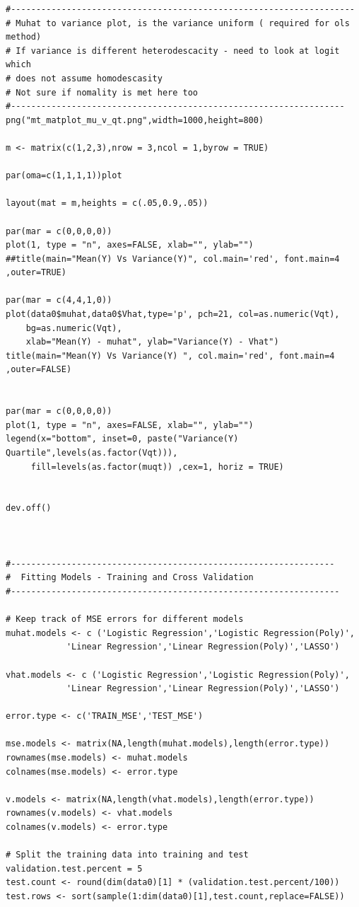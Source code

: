 \documentclass[twoside,12pt]{article}
\begin{document}
\begin{verbatim}
#--------------------------------------------------------------------
# Muhat to variance plot, is the variance uniform ( required for ols method)
# If variance is different heterodescacity - need to look at logit which
# does not assume homodescasity
# Not sure if nomality is met here too
#------------------------------------------------------------------
png("mt_matplot_mu_v_qt.png",width=1000,height=800)

m <- matrix(c(1,2,3),nrow = 3,ncol = 1,byrow = TRUE)

par(oma=c(1,1,1,1))plot

layout(mat = m,heights = c(.05,0.9,.05))

par(mar = c(0,0,0,0))
plot(1, type = "n", axes=FALSE, xlab="", ylab="")
##title(main="Mean(Y) Vs Variance(Y)", col.main='red', font.main=4 ,outer=TRUE)

par(mar = c(4,4,1,0))
plot(data0$muhat,data0$Vhat,type='p', pch=21, col=as.numeric(Vqt), 
	bg=as.numeric(Vqt),
	xlab="Mean(Y) - muhat", ylab="Variance(Y) - Vhat")
title(main="Mean(Y) Vs Variance(Y) ", col.main='red', font.main=4 ,outer=FALSE)


par(mar = c(0,0,0,0))
plot(1, type = "n", axes=FALSE, xlab="", ylab="")
legend(x="bottom", inset=0, paste("Variance(Y) Quartile",levels(as.factor(Vqt))),
	 fill=levels(as.factor(muqt)) ,cex=1, horiz = TRUE)


dev.off()

	

#----------------------------------------------------------------
#  Fitting Models - Training and Cross Validation
#-----------------------------------------------------------------

# Keep track of MSE errors for different models
muhat.models <- c ('Logistic Regression','Logistic Regression(Poly)',
			'Linear Regression','Linear Regression(Poly)','LASSO')

vhat.models <- c ('Logistic Regression','Logistic Regression(Poly)',
			'Linear Regression','Linear Regression(Poly)','LASSO')

error.type <- c('TRAIN_MSE','TEST_MSE')

mse.models <- matrix(NA,length(muhat.models),length(error.type))
rownames(mse.models) <- muhat.models
colnames(mse.models) <- error.type

v.models <- matrix(NA,length(vhat.models),length(error.type))
rownames(v.models) <- vhat.models
colnames(v.models) <- error.type

# Split the training data into training and test
validation.test.percent = 5
test.count <- round(dim(data0)[1] * (validation.test.percent/100))
test.rows <- sort(sample(1:dim(data0)[1],test.count,replace=FALSE))


\end{verbatim}
\end{document}
